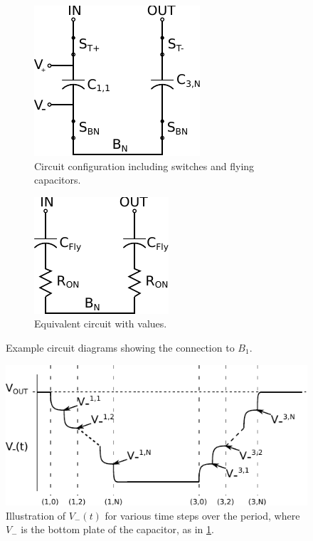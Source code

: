 \documentclass[conference]{IEEEtran}
\begin{document}
	\begin{figure}
		\centering
		\begin{subfigure}{0.4\textwidth}
			\centering
			\includegraphics{Figures/step2_Circ.pdf}
			\caption{Circuit configuration including switches and flying capacitors.}
			\label{fig:step_Circ1}
		\end{subfigure}
		\begin{subfigure}{0.4\textwidth}
			\centering
			\includegraphics{Figures/step2_Eq.pdf}
			\caption{Equivalent circuit with values.}
			\label{fig:step_Circ2}	
	\end{subfigure}
		\caption{Example circuit diagrams showing the connection to $B_1$.}
	\end{figure}

	\begin{figure}
		\centering
		\includegraphics[width=0.9\linewidth]{Figures/V-(t).pdf}
		\caption{Illustration of $V_{-}(t)$ for various time steps over the period, where $V_-$ is the bottom plate of the capacitor, as in \ref{fig:step_Circ1}.}
		\label{fig:V-(t)}
	\end{figure}
	
\end{document}
